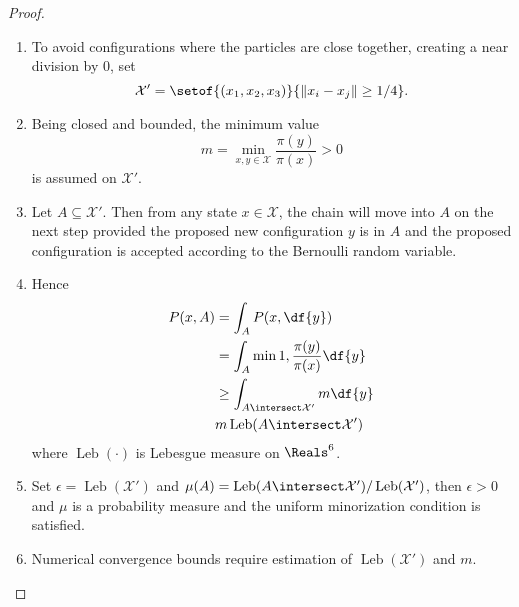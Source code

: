 \documentclass[12pt]{article}
\begin{document}
\begin{example}
    \begin{proof}
        \begin{enumerate}
            \item
                To avoid configurations where the particles are close
                together, creating a near division by \( 0 \), set
                \[
                    \mathcal{X}' = \setof{(x_1,x_2,x_3)}{\| x_i - x_j \|
                    \ge 1/4}.
                \]
            \item
                Being closed and bounded, the minimum value
                \[
                    m = \min_{x,y \in \mathcal{X}} \frac{\pi(y)}{\pi(x)}
                    > 0
                \] is assumed on \( \mathcal{X}' \).
            \item
                Let \( A \subseteq \mathcal{X}' \).  Then from any state
                \( x \in \mathcal{X} \), the chain will move into \( A \)
                on the next step provided the proposed new configuration
                \( y \) is in \( A \) and the proposed configuration is
                accepted according to the Bernoulli random variable.
            \item
                Hence
                \begin{align*}
                    P(x,A) &= \int_A P(x,\df{y}) \\
                    &= \int_A \min{1, \frac{\pi(y)}{\pi(x)}} \df{y} \\
                    &\ge \int_{A \intersect \mathcal{X}'} m \df{y} \\
                    & m
                    \operatorname{Leb}
                    (A \intersect \mathcal{X}')
                \end{align*}
                where \(
                \operatorname{Leb}
                (\cdot) \) is Lebesgue measure on \( \Reals^6 \).
            \item
                Set \( \epsilon =
                \operatorname{Leb}
                (\mathcal{X}') \) and \( \mu(A) =
                \operatorname{Leb}
                (A \intersect \mathcal{X}')/
                \operatorname{Leb}
                (\mathcal{X}') \), then \( \epsilon > 0 \) and \( \mu \)
                is a probability measure and the uniform minorization
                condition is satisfied.
            \item
                Numerical convergence bounds require estimation of \(
                \operatorname{Leb}
                (\mathcal{X}') \) and \( m \).

\end{enumerate}
\end{proof}
\end{example}
\end{document}
